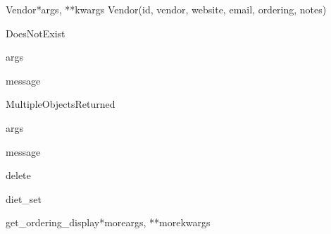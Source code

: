 \documentclass[letterpaper,10pt,english]{sphinxmanual}
\begin{document}
\hypertarget{data.models.Vendor}{}\begin{classdesc}{Vendor}{*args, **kwargs}
Vendor(id, vendor, website, email, ordering, notes)

\hypertarget{data.models.Vendor.DoesNotExist}{}\begin{excdesc}{DoesNotExist}~

\hypertarget{data.models.Vendor.DoesNotExist.args}{}\begin{memberdesc}{args}\end{memberdesc}

\hypertarget{data.models.Vendor.DoesNotExist.message}{}\begin{memberdesc}{message}\end{memberdesc}
\end{excdesc}

\hypertarget{data.models.Vendor.MultipleObjectsReturned}{}\begin{excdesc}{MultipleObjectsReturned}~

\hypertarget{data.models.Vendor.MultipleObjectsReturned.args}{}\begin{memberdesc}{args}\end{memberdesc}

\hypertarget{data.models.Vendor.MultipleObjectsReturned.message}{}\begin{memberdesc}{message}\end{memberdesc}
\end{excdesc}

\hypertarget{data.models.Vendor.delete}{}\begin{methoddesc}[Vendor]{delete}{}\end{methoddesc}

\hypertarget{data.models.Vendor.diet_set}{}\begin{memberdesc}[Vendor]{diet\_set}\end{memberdesc}

\hypertarget{data.models.Vendor.get_ordering_display}{}\begin{methoddesc}[Vendor]{get\_ordering\_display}{*moreargs, **morekwargs}\end{methoddesc}


\end{classdesc}
\end{document}
